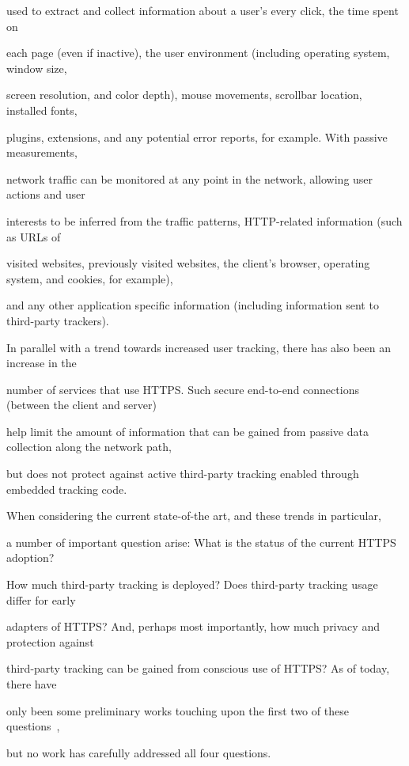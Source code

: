 \documentclass{sig-alternate-10pt}
\begin{document}
used to extract and collect information about a user's every click, the time spent on 

each page (even if inactive), the user environment (including operating system, window size, 

screen resolution, and color depth), mouse movements, scrollbar location, installed fonts, 

plugins, extensions, and any potential error reports, for example.  With passive measurements, 

network traffic can be monitored at any point in the network, allowing user actions and user 

interests to be inferred from the traffic patterns, HTTP-related information (such as URLs of 

visited websites, previously visited websites, the client's browser, operating system, and cookies, for example), 

and any other application specific information (including information sent to third-party trackers).



In parallel with a trend towards increased user tracking, there has also been an increase in the 

number of services that use HTTPS.  Such secure end-to-end connections (between the client and server) 

help limit the amount of information that can be gained from passive data collection along the network path, 

but does not protect against active third-party tracking enabled through embedded tracking code.  

When considering the current state-of-the art, and these trends in particular, 

a number of important question arise:  What is the status of the current HTTPS adoption?  

How much third-party tracking is deployed?  Does third-party tracking usage differ for early 

adapters of HTTPS? And, perhaps most importantly, how much privacy and protection against 

third-party tracking can be gained from conscious use of HTTPS?  As of today, there have 

only been some preliminary works touching upon the first two of these questions~\cite{BuMS11,NFL+14}, 

but no work has carefully addressed all four questions.
\end{document}
